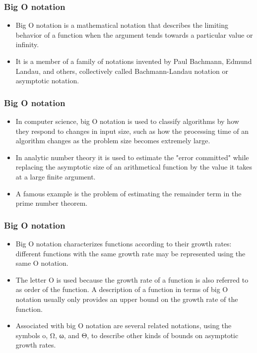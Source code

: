 \documentclass{beamer}
\begin{document}
\begin{frame}
\frametitle{Big O notation}
\large
\begin{itemize}
\item Big O notation is a mathematical notation that describes the limiting behavior of a function when the argument tends towards a particular value or infinity. 
\item It is a member of a family of notations invented by Paul Bachmann, Edmund Landau, and others, collectively called Bachmann-Landau notation or asymptotic notation.
\end{itemize}
\end{frame}

\begin{frame}
\frametitle{Big O notation}
\large
\begin{itemize}
\item In computer science, big O notation is used to classify algorithms by how they respond to changes in input size, such as how the processing time of an algorithm changes as the problem size becomes extremely large.
\item In analytic number theory it is used to estimate the "error committed" while replacing the asymptotic size of an arithmetical function by the value it takes at a large finite argument. 
\item A famous example is the problem of estimating the remainder term in the prime number theorem.
\end{itemize}
\end{frame}
\begin{frame}
\frametitle{Big O notation}
\large
\begin{itemize}
\item Big O notation characterizes functions according to their growth rates: different functions with the same growth rate may be represented using the same O notation.
\item 
The letter O is used because the growth rate of a function is also referred to as order of the function. A description of a function in terms of big O notation usually only provides an upper bound on the growth rate of the function.
\item Associated with big O notation are several related notations, using the symbols o, Ω, ω, and Θ, to describe other kinds of bounds on asymptotic growth rates.
\end{itemize}
\end{frame}
\end{document}
